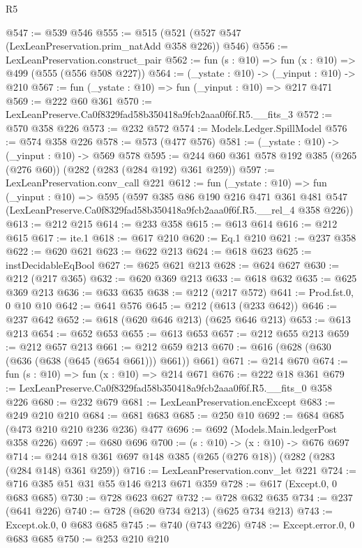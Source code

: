\begin{lexlean}{R5}
\begin{coremodule}
@547 := @539 @546
@555 := @515 (@521 (@527 @547 (LexLeanPreservation.prim_natAdd @358 @226)) @546)
@556 := LexLeanPreservation.construct_pair
@562 := fun (s : @10) => fun (x : @10) => @499 (@555 (@556 @508 @227))
@564 := (_ystate : @10) -> (_yinput : @10) -> @210
@567 := fun (_ystate : @10) => fun (_yinput : @10) => @217 @471
@569 := @222 @60 @361
@570 := LexLeanPreserve.Ca0f8329fad58b350418a9fcb2aaa0f6f.R5.__fits_3
@572 := @570 @358 @226
@573 := @232 @572
@574 := Models.Ledger.SpillModel
@576 := @574 @358 @226
@578 := @573 (@477 @576)
@581 := (_ystate : @10) -> (_yinput : @10) -> @569 @578
@595 := @244 @60 @361 @578 @192 @385 (@265 (@276 @60)) (@282 (@283 (@284 @192) @361 @259))
@597 := LexLeanPreservation.conv_call @221
@612 := fun (_ystate : @10) =>
  fun (_yinput : @10) =>
  @595
    (@597
      @385
      @86
      @190
      @216
      @471
      @361
      @481
      @547
      (LexLeanPreserve.Ca0f8329fad58b350418a9fcb2aaa0f6f.R5.__rel_4 @358 @226))
@613 := @212 @215
@614 := @233 @358
@615 := @613 @614
@616 := @212 @615
@617 := ite.{1}
@618 := @617 @210
@620 := Eq.{1} @210
@621 := @237 @358
@622 := @620 @621
@623 := @622 @213
@624 := @618 @623
@625 := instDecidableEqBool
@627 := @625 @621 @213
@628 := @624 @627
@630 := @212 (@217 @365)
@632 := @620 @369 @213
@633 := @618 @632
@635 := @625 @369 @213
@636 := @633 @635
@638 := @212 (@217 @572)
@641 := Prod.fst.{0, 0} @10 @10
@642 := @641 @576
@645 := @212 (@613 (@233 @642))
@646 := @237 @642
@652 := @618 (@620 @646 @213) (@625 @646 @213)
@653 := @613 @213
@654 := @652 @653
@655 := @613 @653
@657 := @212 @655 @213
@659 := @212 @657 @213
@661 := @212 @659 @213
@670 := @616 (@628 (@630 (@636 (@638 (@645 (@654 @661))) @661)) @661)
@671 := @214 @670
@674 := fun (s : @10) => fun (x : @10) => @214 @671
@676 := @222 @18 @361
@679 := LexLeanPreserve.Ca0f8329fad58b350418a9fcb2aaa0f6f.R5.__fits_0 @358 @226
@680 := @232 @679
@681 := LexLeanPreservation.encExcept
@683 := @249 @210 @210
@684 := @681 @683
@685 := @250 @10
@692 := @684 @685 (@473 @210 @210 @236 @236) @477
@696 := @692 (Models.Main.ledgerPost @358 @226)
@697 := @680 @696
@700 := (s : @10) -> (x : @10) -> @676 @697
@714 := @244 @18 @361 @697 @148 @385 (@265 (@276 @18)) (@282 (@283 (@284 @148) @361 @259))
@716 := LexLeanPreservation.conv_let @221
@724 := @716 @385 @51 @31 @55 @146 @213 @671 @359
@728 := @617 (Except.{0, 0} @683 @685)
@730 := @728 @623 @627
@732 := @728 @632 @635
@734 := @237 (@641 @226)
@740 := @728 (@620 @734 @213) (@625 @734 @213)
@743 := Except.ok.{0, 0} @683 @685
@745 := @740 (@743 @226)
@748 := Except.error.{0, 0} @683 @685
@750 := @253 @210 @210

\end{coremodule}
\end{lexlean}
